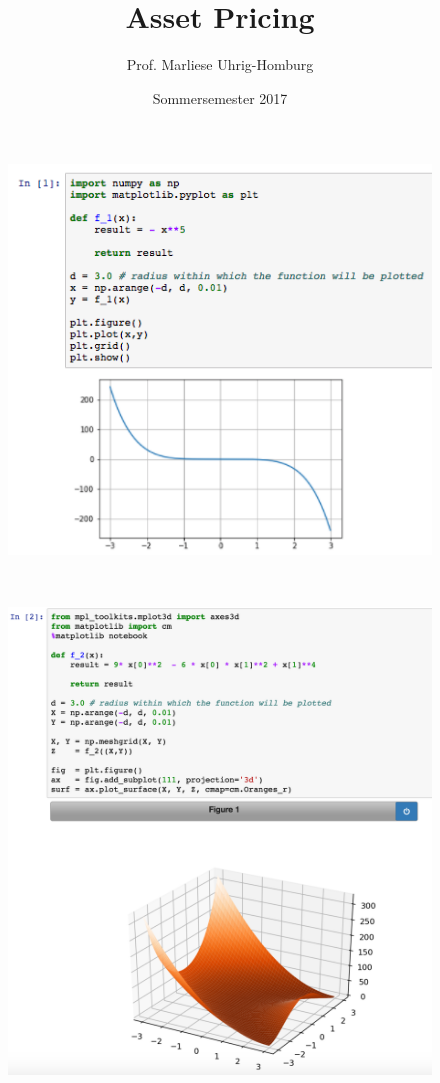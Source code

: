 \documentclass[12pt]{extreport} %
\title{Asset Pricing}
\author{Prof. Marliese Uhrig-Homburg}
\date{Sommersemester 2017}
\theoremstyle{named}
\theoremstyle{nnamed}
\theoremstyle{itshape}
\theoremstyle{normal}
\begin{document}
\thispagestyle{empty}


\begin{figure}[h!]
  \centering
  \includegraphics[scale=0.55]{img/sui-i}
  \label{fig:sub1}
\end{figure} ~\smallskip

\begin{figure}[h!]
  \centering
  \includegraphics[scale=0.41]{img/sui-ii}
  \label{fig:sub2}
\end{figure}
\end{document}
